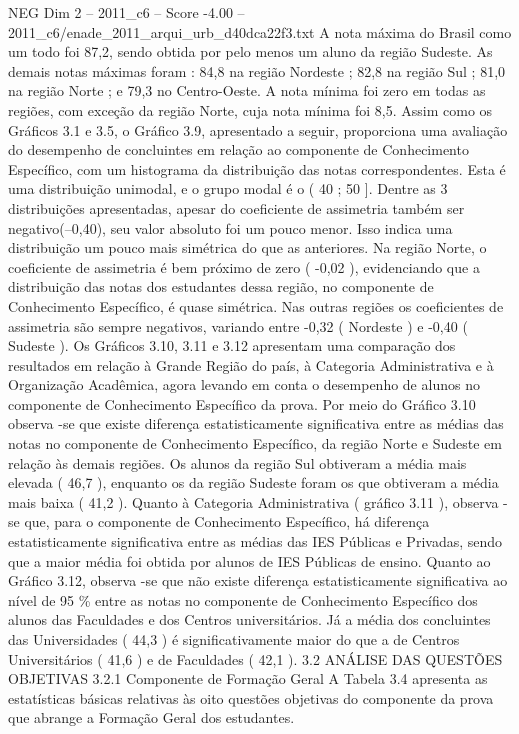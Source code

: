 \begin{textsample}{NEG Dim 2 – 2011\_c6 – Score -4.00 – 2011\_c6/enade\_2011\_arqui\_urb\_d40dca22f3.txt}
A nota máxima do Brasil como um todo foi 87,2, sendo obtida por pelo menos um aluno da região Sudeste.
As demais notas máximas foram : 84,8 na região Nordeste ; 82,8 na região Sul ; 81,0 na região Norte ; e 79,3 no Centro-Oeste.
A nota mínima foi zero em todas as regiões, com exceção da região Norte, cuja nota mínima foi 8,5.
Assim como os Gráficos 3.1 e 3.5, o Gráfico 3.9, apresentado a seguir, proporciona uma avaliação do desempenho de concluintes em relação ao componente de Conhecimento Específico, com um histograma da distribuição das notas correspondentes.
Esta é uma distribuição unimodal, e o grupo modal é o ( 40 ; 50 ].
Dentre as 3 distribuições apresentadas, apesar do coeficiente de assimetria também ser negativo(–0,40), seu valor absoluto foi um pouco menor.
Isso indica uma distribuição um pouco mais simétrica do que as anteriores.
Na região Norte, o coeficiente de assimetria é bem próximo de zero ( -0,02 ), evidenciando que a distribuição das notas dos estudantes dessa região, no componente de Conhecimento Específico, é quase simétrica.
Nas outras regiões os coeficientes de assimetria são sempre negativos, variando entre -0,32 ( Nordeste ) e -0,40 ( Sudeste ).
Os Gráficos 3.10, 3.11 e 3.12 apresentam uma comparação dos resultados em relação à Grande Região do país, à Categoria Administrativa e à Organização Acadêmica, agora levando em conta o desempenho de alunos no componente de Conhecimento Específico da prova.
Por meio do Gráfico 3.10 observa -se que existe diferença estatisticamente significativa entre as médias das notas no componente de Conhecimento Específico, da região Norte e Sudeste em relação às demais regiões.
Os alunos da região Sul obtiveram a média mais elevada ( 46,7 ), enquanto os da região Sudeste foram os que obtiveram a média mais baixa ( 41,2 ).
Quanto à Categoria Administrativa ( gráfico 3.11 ), observa -se que, para o componente de Conhecimento Específico, há diferença estatisticamente significativa entre as médias das IES Públicas e Privadas, sendo que a maior média foi obtida por alunos de IES Públicas de ensino.
Quanto ao Gráfico 3.12, observa -se que não existe diferença estatisticamente significativa ao nível de 95 \% entre as notas no componente de Conhecimento Específico dos alunos das Faculdades e dos Centros universitários.
Já a média dos concluintes das Universidades ( 44,3 ) é significativamente maior do que a de Centros Universitários ( 41,6 ) e de Faculdades ( 42,1 ). 3.2 ANÁLISE DAS QUESTÕES OBJETIVAS 3.2.1 Componente de Formação Geral A Tabela 3.4 apresenta as estatísticas básicas relativas às oito questões objetivas do componente da prova que abrange a Formação Geral dos estudantes.

\end{textsample}
